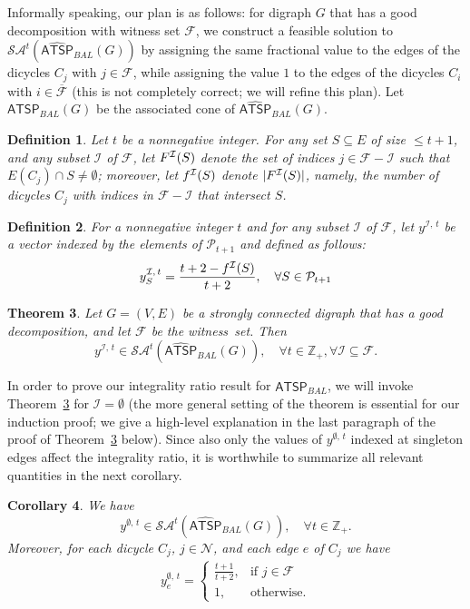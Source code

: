 \documentclass[11pt]{article}
\newtheorem{theorem}{Theorem}[section]
\newtheorem{corollary}[theorem]{Corollary}
\newtheorem{definition}[theorem]{Definition}
\def \integers {\mathbb{Z}}
\newcommand{\atspbal}{\homog{\textsf{ATSP$_{\mathit{BAL}}$}}}
\newcommand{\atspbalpolytope}{\widehat{\textsf{ATSP}}_{\mathit{BAL}}}
\newcommand{\cindset}{\mathcal{N}}
\newcommand{\fracset}{\mathcal{F}}
\newcommand{\notfracset}{\overline{\mathcal{F}}}
\newcommand{\sgn}{\mathcal{I}}
\newcommand{\yvec}[2]{y^{#1,\,#2}}	\newcommand{\zvec}[2]{y^{#1,\,#2}}	\newcommand{\zveconly}{y}
\newcommand{\saop}{\mathcal{SA}}
\newcommand{\homog}[1]{{#1}}
\begin{document}
Informally speaking, our plan is as follows:
for digraph $G$ that has a good decomposition with witness set $\fracset$,
we construct a feasible solution to $\saop^t(\homog{\atspbalpolytope(G)})$
by assigning the same fractional value to the edges of
the dicycles $C_j$ with $j\in\fracset$,
while assigning the value $1$
to the edges of the dicycles $C_i$ with $i\in\notfracset$
(this is not completely correct; we will refine this plan).
Let $\atspbal(G)$ be the associated cone of $\atspbalpolytope(G)$.




\begin{definition}
\label{def:goodfrac}
Let $t$ be a nonnegative integer.
For any set $S\subseteq E$ of size $\leq t+1$, and
any subset $\sgn$ of $\fracset$,
let $\goodfrac{\sgn}{S}$ denote
the set of indices $j\in \fracset-\sgn$ such that
$E(C_j) \cap S \not=\emptyset$;
moreover, let $\szgoodfrac{\sgn}{S}$ denote $|\goodfrac{\sgn}{S}|$,
namely, the number of dicycles $C_j$ with indices in $\fracset-\sgn$
that intersect $S$.
\end{definition}


\begin{definition}
\label{def:balanced}
For a nonnegative integer $t$ and
for any subset $\sgn$ of $\fracset$,
let $\yvec{\sgn}{t}$ be a vector indexed by the elements of
$\mathcal{P}_{t+1}$ and defined as follows:
\[
\yvec{\sgn}{t}_S  = \frac{t+2-\szgoodfrac{\sgn}{S}}{t+2},
	\quad \forall S \in \mathcal{P}_{t+1}
\]
\end{definition}

\begin{theorem}
\label{thm:balanced}
Let $G=(V,E)$ be a strongly connected digraph that
has a good decomposition,
and let $\fracset$ be the witness~set. Then
\[ \yvec{\sgn}{t} \in \saop^t(\homog{\atspbalpolytope(G)}), \quad
	\forall t\in\integers_+, \forall \sgn \subseteq \fracset. \]
\end{theorem}
In order to prove our integrality ratio result for $\atspbalpolytope$, we will invoke Theorem~\ref{thm:balanced} for $\sgn=\emptyset$ (the more general setting of the theorem is essential for our induction proof; we give a high-level explanation in the last paragraph of the proof of Theorem~\ref{thm:balanced} below). 
Since also only the values of $\yvec{\emptyset}{t}$ indexed at singleton edges affect the integrality ratio, 
it is worthwhile to summarize all relevant quantities in the next corollary. 


\begin{corollary}
\label{coro:balanced-empty}
We have
\[ \yvec{\emptyset}{t} \in \saop^t(\homog{\atspbalpolytope(G)}), \quad \forall t\in\integers_+.
\]
Moreover, 
for each dicycle $C_j$, $j\in\cindset$, and each edge $e$ of $C_j$ we have
\begin{align}
\yvec{\emptyset}{t}_e =
 \begin{cases}
  \frac{t+1}{t+2},	&\text{if } j \in \fracset\\
  {1},			&\text{otherwise}.
 \end{cases}
\end{align}
\end{corollary}
\end{document}

